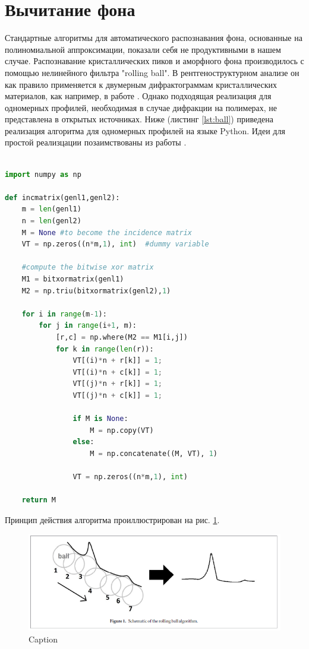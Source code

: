 	\section{Вычитание фона}
	
	Стандартные алгоритмы для автоматического распознавания фона, основанные на полиномиальной аппроксимации, показали себя не продуктивными в нашем случае. Распознавание кристаллических пиков и аморфного фона производилось с помощью нелинейного фильтра "rolling ball". В рентгеноструктурном анализе он как правило применяется к двумерным дифрактограммам кристаллических материалов, как например, в работе \cite{ball2018}. Однако подходящая реализация для одномерных профилей, необходимая в случае дифракции на полимерах, не представлена в открытых источниках. Ниже (листинг \ref{lst:ball}) приведена реализация алгоритма для одномерных профилей на языке Python. 
	Идеи для простой реализцации позаимствованы из работы \cite{ball-code}. 

	\begin{lstlisting}[language=Python, caption=Алгоритм распознавания фона, label={lst:ball}]
	
import numpy as np
 
def incmatrix(genl1,genl2):
    m = len(genl1)
    n = len(genl2)
    M = None #to become the incidence matrix
    VT = np.zeros((n*m,1), int)  #dummy variable
 
    #compute the bitwise xor matrix
    M1 = bitxormatrix(genl1)
    M2 = np.triu(bitxormatrix(genl2),1) 
 
    for i in range(m-1):
        for j in range(i+1, m):
            [r,c] = np.where(M2 == M1[i,j])
            for k in range(len(r)):
                VT[(i)*n + r[k]] = 1;
                VT[(i)*n + c[k]] = 1;
                VT[(j)*n + r[k]] = 1;
                VT[(j)*n + c[k]] = 1;
 
                if M is None:
                    M = np.copy(VT)
                else:
                    M = np.concatenate((M, VT), 1)
 
                VT = np.zeros((n*m,1), int)
 
    return M
\end{lstlisting}

	Принцип действия алгоритма проиллюстрирован на рис. \ref{fig:ball}. 
	
	\begin{figure}[ht]
	    \centering
	    \includegraphics[width=\linewidth]{fig/ball.PNG}
	    \caption{Caption}
	    \label{fig:ball}
	\end{figure}



